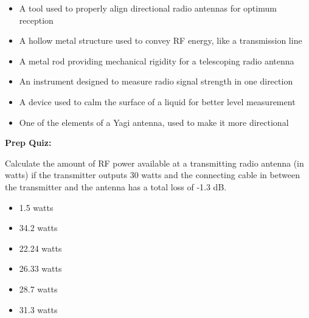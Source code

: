 \begin{itemize}
\item{} A tool used to properly align directional radio antennas for optimum reception
\vskip 5pt 
\item{} A hollow metal structure used to convey RF energy, like a transmission line
\vskip 5pt 
\item{} A metal rod providing mechanical rigidity for a telescoping radio antenna
\vskip 5pt 
\item{} An instrument designed to measure radio signal strength in one direction
\vskip 5pt 
\item{} A device used to calm the surface of a liquid for better level measurement
\vskip 5pt 
\item{} One of the elements of a Yagi antenna, used to make it more directional
\end{itemize}


\vfil \eject

\noindent
{\bf Prep Quiz:}

Calculate the amount of RF power available at a transmitting radio antenna (in watts) if the transmitter outputs 30 watts and the connecting cable in between the transmitter and the antenna has a total loss of -1.3 dB.

\begin{itemize}
\item{} 1.5 watts
\vskip 5pt 
\item{} 34.2 watts
\vskip 5pt 
\item{} 22.24 watts
\vskip 5pt 
\item{} 26.33 watts
\vskip 5pt 
\item{} 28.7 watts
\vskip 5pt 
\item{} 31.3 watts
\end{itemize}





